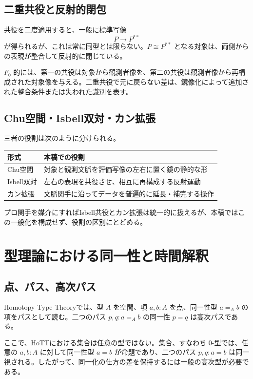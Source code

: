 \documentclass[a4paper,11pt]{ltjsarticle}
\theoremstyle{definition}
\theoremstyle{plain}
\begin{document}
\subsection{二重共役と反射的閉包}

共役を二度適用すると、一般に標準写像
\begin{equation}
 P\longrightarrow P^{**}
\end{equation}
が得られるが、これは常に同型とは限らない。$P\cong P^{**}$ となる対象は、両側からの表現が整合して反射的に閉じている。

$F_0$ 的には、第一の共役は対象から観測者像を、第二の共役は観測者像から再構成された対象像を与える。二重共役で元に戻らない差は、鏡像化によって追加された整合条件または失われた識別を表す。

\subsection{Chu空間・Isbell双対・カン拡張}

三者の役割は次のように分けられる。
\begin{center}
\begin{tabular}{p{} p{}}
\toprule
形式 & 本稿での役割 \\
\midrule
Chu空間 & 対象と観測文脈を評価写像の左右に置く鏡の静的な形 \\
Isbell双対 & 左右の表現を共役させ、相互に再構成する反射運動 \\
カン拡張 & 文脈関手に沿ってデータを普遍的に延長・補完する操作 \\
\bottomrule
\end{tabular}
\end{center}
プロ関手を媒介にすればIsbell共役とカン拡張は統一的に扱えるが、本稿ではこの一般化を構成せず、役割の区別にとどめる。

\section{型理論における同一性と時間解釈}

\subsection{点、パス、高次パス}

Homotopy Type Theoryでは、型 $A$ を空間、項 $a,b:A$ を点、同一性型 $a=_A b$ の項をパスとして読む。二つのパス $p,q:a=_A b$ の同一性 $p=q$ は高次パスである\cite{HoTT2013}。

ここで、HoTTにおける集合は任意の型ではない。集合、すなわち $0$-型では、任意の $a,b:A$ に対して同一性型 $a=b$ が命題であり、二つのパス $p,q:a=b$ は同一視される。したがって、同一化の仕方の差を保持するには一般の高次型が必要である。
\end{document}
